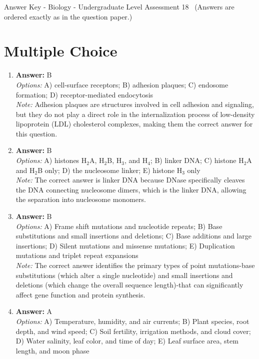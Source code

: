 \documentclass[12pt]{article}
\begin{document}
\begin{center}
Answer Key - Biology - Undergraduate Level Assessment 18 \
\small (Answers are ordered exactly as in the question paper.)
\end{center}

\section*{Multiple Choice}
\begin{enumerate}[label=\arabic*.]
\item \textbf{Answer:} B
\\ \textit{Options:} A) cell-surface receptors; B) adhesion plaques; C) endosome formation; D) receptor-mediated endocytosis
\\ \textit{Note:} Adhesion plaques are structures involved in cell adhesion and signaling, but they do not play a direct role in the internalization process of low-density lipoprotein (LDL) cholesterol complexes, making them the correct answer for this question.
\item \textbf{Answer:} B
\\ \textit{Options:} A) histones H$_{2}$A, H$_{2}$B, H$_{3}$, and H$_{4}$; B) linker DNA; C) histone H$_{2}$A and H$_{2}$B only; D) the nucleosome linker; E) histone H$_{3}$ only
\\ \textit{Note:} The correct answer is linker DNA because DNase specifically cleaves the DNA connecting nucleosome dimers, which is the linker DNA, allowing the separation into nucleosome monomers.
\item \textbf{Answer:} B
\\ \textit{Options:} A) Frame shift mutations and nucleotide repeats; B) Base substitutions and small insertions and deletions; C) Base additions and large insertions; D) Silent mutations and missense mutations; E) Duplication mutations and triplet repeat expansions
\\ \textit{Note:} The correct answer identifies the primary types of point mutations-base substitutions (which alter a single nucleotide) and small insertions and deletions (which change the overall sequence length)-that can significantly affect gene function and protein synthesis.
\item \textbf{Answer:} A
\\ \textit{Options:} A) Temperature, humidity, and air currents; B) Plant species, root depth, and wind speed; C) Soil fertility, irrigation methods, and cloud cover; D) Water salinity, leaf color, and time of day; E) Leaf surface area, stem length, and moon phase

\end{enumerate}
\end{document}
